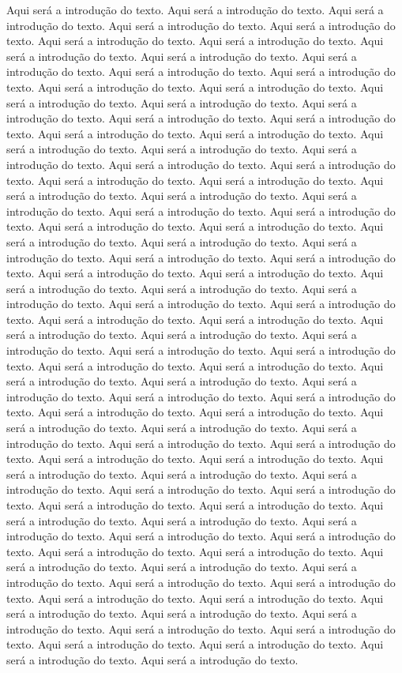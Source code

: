 Aqui será a introdução do texto. Aqui será a introdução do texto.
Aqui será a introdução do texto. Aqui será a introdução do texto.
Aqui será a introdução do texto. Aqui será a introdução do texto.
Aqui será a introdução do texto. Aqui será a introdução do texto.
Aqui será a introdução do texto. Aqui será a introdução do texto.
Aqui será a introdução do texto. Aqui será a introdução do texto.
Aqui será a introdução do texto. Aqui será a introdução do texto.
Aqui será a introdução do texto. Aqui será a introdução do texto.
Aqui será a introdução do texto. Aqui será a introdução do texto.
Aqui será a introdução do texto. Aqui será a introdução do texto.
Aqui será a introdução do texto. Aqui será a introdução do texto.
Aqui será a introdução do texto. Aqui será a introdução do texto.
Aqui será a introdução do texto. Aqui será a introdução do texto.
Aqui será a introdução do texto. Aqui será a introdução do texto.
Aqui será a introdução do texto. Aqui será a introdução do texto.
Aqui será a introdução do texto. Aqui será a introdução do texto.
Aqui será a introdução do texto. Aqui será a introdução do texto.
Aqui será a introdução do texto. Aqui será a introdução do texto.
Aqui será a introdução do texto. Aqui será a introdução do texto.
Aqui será a introdução do texto. Aqui será a introdução do texto.
Aqui será a introdução do texto. Aqui será a introdução do texto.
Aqui será a introdução do texto. Aqui será a introdução do texto.
Aqui será a introdução do texto. Aqui será a introdução do texto.
Aqui será a introdução do texto. Aqui será a introdução do texto.
Aqui será a introdução do texto. Aqui será a introdução do texto.
Aqui será a introdução do texto. Aqui será a introdução do texto.
Aqui será a introdução do texto. Aqui será a introdução do texto.
Aqui será a introdução do texto. Aqui será a introdução do texto.
Aqui será a introdução do texto. Aqui será a introdução do texto.
Aqui será a introdução do texto. Aqui será a introdução do texto.
Aqui será a introdução do texto. Aqui será a introdução do texto.
Aqui será a introdução do texto. Aqui será a introdução do texto.
Aqui será a introdução do texto. Aqui será a introdução do texto.
Aqui será a introdução do texto. Aqui será a introdução do texto.
Aqui será a introdução do texto. Aqui será a introdução do texto.
Aqui será a introdução do texto. Aqui será a introdução do texto.
Aqui será a introdução do texto. Aqui será a introdução do texto.
Aqui será a introdução do texto. Aqui será a introdução do texto.
Aqui será a introdução do texto. Aqui será a introdução do texto.
Aqui será a introdução do texto. Aqui será a introdução do texto.
Aqui será a introdução do texto. Aqui será a introdução do texto.
Aqui será a introdução do texto. Aqui será a introdução do texto.
Aqui será a introdução do texto. Aqui será a introdução do texto.
Aqui será a introdução do texto. Aqui será a introdução do texto.
Aqui será a introdução do texto. Aqui será a introdução do texto.
Aqui será a introdução do texto. Aqui será a introdução do texto.
Aqui será a introdução do texto. Aqui será a introdução do texto.
Aqui será a introdução do texto. Aqui será a introdução do texto.
Aqui será a introdução do texto. Aqui será a introdução do texto.
Aqui será a introdução do texto. Aqui será a introdução do texto.

